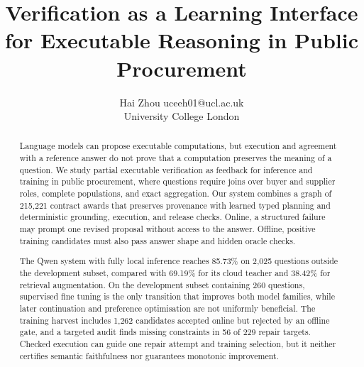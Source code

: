 \documentclass{article}
\title{Verification as a Learning Interface for Executable Reasoning in Public Procurement}
\author{\name Hai Zhou \email uceeh01@ucl.ac.uk \\
 \addr University College London}
\begin{document}
\maketitle

\begin{abstract}
Language models can propose executable computations, but execution and agreement with a reference
answer do not prove that a computation preserves the meaning of a question.  We study partial
executable verification as feedback for inference and training in public procurement, where
questions require joins over buyer and supplier roles, complete populations, and exact aggregation.
Our system combines a graph of 215,221 contract awards that preserves provenance with learned typed
planning and deterministic grounding, execution, and release checks.  Online, a structured failure
may prompt one revised proposal without access to the answer.  Offline, positive training
candidates must also pass answer shape and hidden oracle checks.

The Qwen system with fully local inference reaches 85.73\% on 2,025 questions outside the
development subset, compared with 69.19\% for its cloud teacher and 38.42\% for retrieval
augmentation.  On the development subset containing 260 questions, supervised fine tuning is the
only transition that improves both model families, while later continuation and preference
optimisation are not uniformly beneficial.  The training harvest includes 1,262 candidates
accepted online but rejected by an offline gate, and a targeted audit finds missing constraints in
56 of 229 repair targets.  Checked execution can guide one repair attempt and training selection,
but it neither certifies semantic faithfulness nor guarantees monotonic improvement.
\end{abstract}










\clearpage



\appendix


\end{document}
